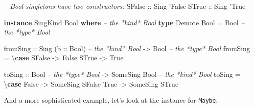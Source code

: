 \documentclass[]{article}
\newenvironment{Shaded}{}{}
\newcommand{\CommentTok}[1]{\textcolor[rgb]{0.38,0.63,0.69}{\textit{#1}}}
\newcommand{\DataTypeTok}[1]{\textcolor[rgb]{0.56,0.13,0.00}{#1}}
\newcommand{\KeywordTok}[1]{\textcolor[rgb]{0.00,0.44,0.13}{\textbf{#1}}}
\newcommand{\NormalTok}[1]{#1}
\newcommand{\OtherTok}[1]{\textcolor[rgb]{0.00,0.44,0.13}{#1}}
\begin{document}
\begin{Shaded}
\begin{Highlighting}[]
\CommentTok{-- Bool singletons have two constructors:}
\DataTypeTok{SFalse}\OtherTok{ ::} \DataTypeTok{Sing} \DataTypeTok{'False}
\DataTypeTok{STrue}\OtherTok{  ::} \DataTypeTok{Sing} \DataTypeTok{'True}

\KeywordTok{instance} \DataTypeTok{SingKind} \DataTypeTok{Bool} \KeywordTok{where}    \CommentTok{-- the *kind* Bool}
    \KeywordTok{type} \DataTypeTok{Demote} \DataTypeTok{Bool} \OtherTok{=} \DataTypeTok{Bool}     \CommentTok{-- the *type* Bool}

\NormalTok{    fromSing}
\OtherTok{        ::} \DataTypeTok{Sing}\NormalTok{ (}\OtherTok{b ::} \DataTypeTok{Bool}\NormalTok{)        }\CommentTok{-- the *kind* Bool}
        \OtherTok{->} \DataTypeTok{Bool}                    \CommentTok{-- the *type* Bool}
\NormalTok{    fromSing }\OtherTok{=}\NormalTok{ \textbackslash{}}\KeywordTok{case}
        \DataTypeTok{SFalse} \OtherTok{->} \DataTypeTok{False}
        \DataTypeTok{STrue}  \OtherTok{->} \DataTypeTok{True}

\NormalTok{    toSing}
\OtherTok{        ::} \DataTypeTok{Bool}                    \CommentTok{-- the *type* Bool}
        \OtherTok{->} \DataTypeTok{SomeSing} \DataTypeTok{Bool}           \CommentTok{-- the *kind* Bool}
\NormalTok{    toSing }\OtherTok{=}\NormalTok{ \textbackslash{}}\KeywordTok{case}
        \DataTypeTok{False} \OtherTok{->} \DataTypeTok{SomeSing} \DataTypeTok{SFalse}
        \DataTypeTok{True}  \OtherTok{->} \DataTypeTok{SomeSing} \DataTypeTok{STrue}
\end{Highlighting}
\end{Shaded}

And a more sophisticated example, let's look at the instance for \texttt{Maybe}:
\end{document}
